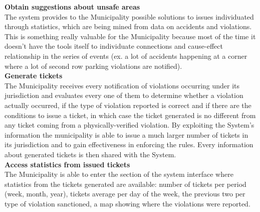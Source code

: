 \documentclass {article}
\begin{document}
\begin{itemize}
		{\bf Obtain suggestions about unsafe areas}\\
		The system provides to the Municipality possible solutions to issues individuated through statistics, which are being mined from data on accidents and violations. This is something really valuable for the Municipality because most of the time it doesn’t have the tools itself to individuate connections and cause-effect relationship in the series of events (ex. a lot of accidents happening at a corner where a lot of second row parking violations are notified).\\
		
		{\bf Generate tickets}\\
		The Municipality receives every notification of violations occurring under its jurisdiction and evaluates every one of them to determine whether a violation actually occurred, if the type of violation reported is correct and if there are the conditions to issue a ticket, in which case the ticket generated is no different from any ticket coming from a physically-verified violation. By exploiting the System’s information the municipality is able to issue a much larger number of tickets in its jurisdiction and to gain effectiveness in enforcing the rules. Every information about generated tickets is then shared with the System.\\
		
		{\bf Access statistics from issued tickets}\\
		The Municipality is able to enter the section of the system interface where statistics from the tickets generated are available: number of tickets per period (week, month, year), tickets average per day of the week, the previous two per type of violation sanctioned, a map showing where the violations were reported.\\
		
		
	\end{itemize}
		
\end{document}
